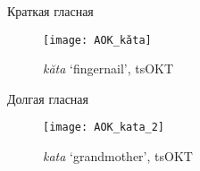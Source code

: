 \documentclass[10 pt, handout]{beamer}
\begin{document}
\begin{frame}{Краткая гласная}
		
	\begin{figure}[H]
		\centering
		\texttt{[image: AOK\_kăta]}
		\label{}
		\caption*{\emph{kăta} `fingernail', tsOKT}
	\end{figure} 

\end{frame}

\begin{frame}{Долгая гласная}
		
	\begin{figure}[H]
		\centering
		\texttt{[image: AOK\_kata\_2]}
		\label{}
		\caption*{\emph{kata} `grandmother', tsOKT}
	\end{figure}

\end{frame}
\end{document}
